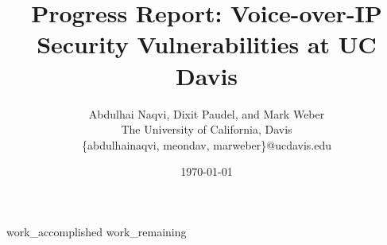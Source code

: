 \documentclass[letterpaper,twocolumn,10pt]{article}
\begin{document}
\title{ Progress Report: Voice-over-IP Security Vulnerabilities at UC Davis}
  \date{ \today }
  \author{Abdulhai Naqvi, Dixit Paudel, and Mark Weber\\
  The University of California, Davis\\
  \{abdulhainaqvi, meondav, marweber\}@ucdavis.edu}

\maketitle


 {work_accomplished}
 {work_remaining}




\appendix


\end{document}
